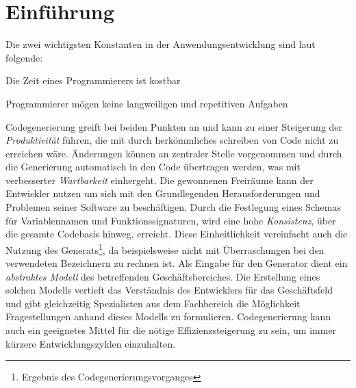 \chapter{Einführung}


Die zwei wichtigsten Konstanten in der Anwendungsentwicklung sind laut \parencite{herrington2003code} folgende:
\begin{compactitem}
    \item Die Zeit eines Programmierers ist kostbar
    \item Programmierer mögen keine langweiligen und repetitiven Aufgaben
\end{compactitem}
Codegenerierung greift bei beiden Punkten an und kann zu einer Steigerung der \emph{Produktivität} führen, die mit durch herkömmliches schreiben von Code nicht zu erreichen wäre. 
Änderungen können an zentraler Stelle vorgenommen und durch die Generierung automatisch in den Code übertragen werden, was mit verbesserter \emph{Wartbarkeit} einhergeht.
Die gewonnenen Freiräume kann der Entwickler nutzen um sich mit den Grundlegenden Herausforderungen und Problemen seiner Software zu beschäftigen.
Durch die Festlegung eines Schemas für Variablennamen und Funktionssignaturen, wird eine hohe \emph{Konsistenz}, über die gesamte Codebasis hinweg, erreicht.
Diese Einheitlichkeit vereinfacht auch die Nutzung des Generats\footnote{Ergebnis des Codegenerierungsvorganges}, da beispielsweise nicht mit Überraschungen bei den verwendeten Bezeichnern zu rechnen ist.
Als Eingabe für den Generator dient ein \emph{abstraktes Modell} des betreffenden Geschäftsbereiches. Die Erstellung eines solchen Modells vertieft das Verständnis des Entwicklers für das Geschäftsfeld und gibt gleichzeitig Spezialisten aus dem Fachbereich die Möglichkeit Fragestellungen anhand dieses Modells zu formulieren.
Codegenerierung kann auch ein geeignetes Mittel für die nötige Effizienzsteigerung zu sein, um immer kürzere Entwicklungszyklen einzuhalten.



